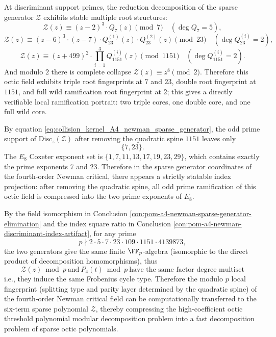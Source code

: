 \begin{conclusion}\label{con:pom-a4-newman-ramification-portrait}
At discriminant support primes, the reduction decomposition of the sparse generator \(\mathcal Z\) exhibits stable multiple root structures:
\[
\mathcal Z(z)\equiv (z-2)^3\cdot Q_7(z)\pmod 7\quad(\deg Q_7=5),
\]
\[
\mathcal Z(z)\equiv (z-6)^3\cdot(z-7)\cdot Q_{23}^{(1)}(z)\cdot Q_{23}^{(2)}(z)\pmod{23}\quad(\deg Q_{23}^{(i)}=2),
\]
\[
\mathcal Z(z)\equiv (z+499)^2\cdot\prod_{i=1}^{3}Q_{1151}^{(i)}(z)\pmod{1151}\quad(\deg Q_{1151}^{(i)}=2).
\]
And modulo \(2\) there is complete collapse \(\mathcal Z(z)\equiv z^8\pmod 2\).
Therefore this octic field exhibits triple root fingerprints at \(7\) and \(23\), double root fingerprint at \(1151\), and full wild ramification root fingerprint at \(2\);
this gives a directly verifiable local ramification portrait: two triple cores, one double core, and one full wild core.
\end{conclusion}

\begin{conclusion}\label{con:pom-a4-newman-e8-exponent-shadow}
By equation \eqref{eq:collision_kernel_A4_newman_sparse_generator}, the odd prime support of \(\mathrm{Disc}_z(\mathcal Z)\) after removing the quadratic spine \(1151\) leaves only
\[
\{7,23\}.
\]
The \(E_8\) Coxeter exponent set is \(\{1,7,11,13,17,19,23,29\}\), which contains exactly the prime exponents \(7\) and \(23\).
Therefore in the sparse generator coordinates of the fourth-order Newman critical, there appears a strictly statable index projection: after removing the quadratic spine, all odd prime ramification of this octic field is compressed into the two prime exponents of \(E_8\).
\end{conclusion}

\begin{conclusion}\label{con:pom-a4-newman-local-fingerprint-transfer}
By the field isomorphism in Conclusion \ref{con:pom-a4-newman-sparse-generator-elimination} and the index square ratio in Conclusion \ref{con:pom-a4-newman-discriminant-index-artifact},
for any prime
\[
p\nmid 2\cdot 5\cdot 7\cdot 23\cdot 109\cdot 1151\cdot 4139873,
\]
the two generators give the same finite \(\FF_p\)-algebra (isomorphic to the direct product of decomposition homomorphisms), thus
\[
\boxed{\;
\mathcal Z(z)\bmod p\ \text{and}\ P_4(t)\bmod p\ \text{have the same factor degree multiset}\;}
\]
i.e., they induce the same Frobenius cycle type.
Therefore the modulo \(p\) local fingerprint (splitting type and parity layer determined by the quadratic spine) of the fourth-order Newman critical field can be computationally transferred to the six-term sparse polynomial \(\mathcal Z\), thereby compressing the high-coefficient octic threshold polynomial modular decomposition problem into a fast decomposition problem of sparse octic polynomials.
\end{conclusion}

